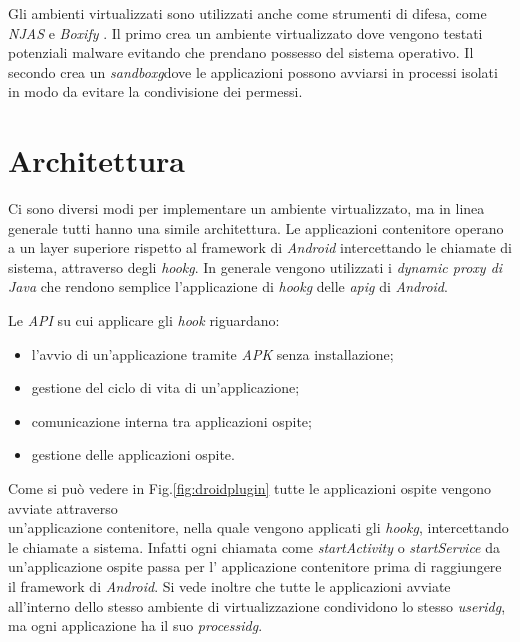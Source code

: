 Gli ambienti virtualizzati sono utilizzati anche come strumenti di difesa, come \emph{NJAS} \cite{NJAS} e \emph{Boxify} \cite{Boxify}. Il primo crea un ambiente virtualizzato dove vengono testati potenziali malware evitando che prendano possesso del sistema operativo. Il secondo crea un \emph{\gls{sandboxg}}\glsfirstoccurspace dove le applicazioni possono avviarsi in processi isolati in modo da evitare la condivisione dei permessi.

\newpage

\section{Architettura}

Ci sono diversi modi per implementare un ambiente virtualizzato, ma in linea generale tutti hanno una simile architettura. Le applicazioni contenitore operano a un layer superiore rispetto al framework di \emph{Android} intercettando le chiamate di sistema, attraverso degli \emph{\gls{hookg}}\glsfirstoccur. In generale vengono utilizzati i \emph{dynamic proxy di Java}\cite{DynamicProxy} che rendono semplice l'applicazione di \emph{\gls{hookg}} delle \emph{\gls{apig}} di \emph{Android}. 

Le \emph{API} su cui applicare gli \emph{\gls{hook}} riguardano:
\begin{itemize}
\item l'avvio di un'applicazione tramite \emph{APK} senza installazione;
\item gestione del ciclo di vita di un'applicazione;
\item comunicazione interna tra applicazioni ospite;
\item gestione delle applicazioni ospite.
\end{itemize}

Come si può vedere in Fig.\ref{fig:droidplugin} tutte le applicazioni ospite vengono avviate attraverso\\ un'applicazione contenitore, nella quale vengono applicati gli \emph{\gls{hookg}}, intercettando le chiamate a sistema. Infatti ogni chiamata come \emph{startActivity} o \emph{startService} da un'applicazione ospite passa per l' applicazione contenitore prima di raggiungere il framework di \emph{Android}. Si vede inoltre che tutte le applicazioni avviate all'interno dello stesso ambiente di virtualizzazione condividono lo stesso \emph{\gls{useridg}}\glsfirstoccur, ma ogni applicazione ha il suo \emph{\gls{processidg}}\glsfirstoccur.

